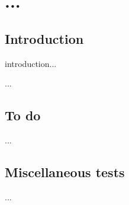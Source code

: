 \chapter{...}
\label{ch:...}
\localtableofcontents
\section{Introduction}
introduction...

...
\begin{devMan}
\section{To do}
...
\section{Miscellaneous tests}

...
\end{devMan}
